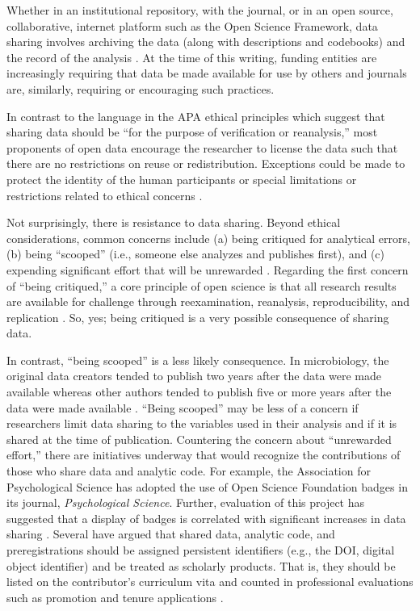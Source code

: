 \documentclass[
  11pt,
]{book}
\begin{document}
Whether in an institutional repository, with the journal, or in an open source, collaborative, internet platform such as the Open Science Framework, data sharing involves archiving the data (along with descriptions and codebooks) and the record of the analysis \citep{stevens_replicability_2017}. At the time of this writing, funding entities are increasingly requiring that data be made available for use by others \citep{ross_ethical_2018} and journals are, similarly, requiring or encouraging such practices.

In contrast to the language in the APA ethical principles which suggest that sharing data should be ``for the purpose of verification or reanalysis,'' most proponents of open data encourage the researcher to license the data such that there are no restrictions on reuse or redistribution. Exceptions could be made to protect the identity of the human participants or special limitations or restrictions related to ethical concerns \citep{bezjak_open_2018}.

Not surprisingly, there is resistance to data sharing. Beyond ethical considerations, common concerns include (a) being critiqued for analytical errors, (b) being ``scooped'' (i.e., someone else analyzes and publishes first), and (c) expending significant effort that will be unrewarded \citep{martone_data_2018}. Regarding the first concern of ``being critiqued,'' a core principle of open science is that all research results are available for challenge through reexamination, reanalysis, reproducibility, and replication \citep{alter_responsible_2018}. So, yes; being critiqued is a very possible consequence of sharing data.

In contrast, ``being scooped'' is a less likely consequence. In microbiology, the original data creators tended to publish two years after the data were made available whereas other authors tended to publish five or more years after the data were made available \citep{martone_data_2018}. ``Being scooped'' may be less of a concern if researchers limit data sharing to the variables used in their analysis and if it is shared at the time of publication. Countering the concern about ``unrewarded effort,'' there are initiatives underway that would recognize the contributions of those who share data and analytic code. For example, the Association for Psychological Science has adopted the use of Open Science Foundation badges in its journal, \emph{Psychological Science}. Further, evaluation of this project has suggested that a display of badges is correlated with significant increases in data sharing \citep{martone_data_2018}. Several have argued that shared data, analytic code, and preregistrations should be assigned persistent identifiers (e.g., the DOI, digital object identifier) and be treated as scholarly products. That is, they should be listed on the contributor's curriculum vita and counted in professional evaluations such as promotion and tenure applications \citep{alter_responsible_2018}.
\end{document}
